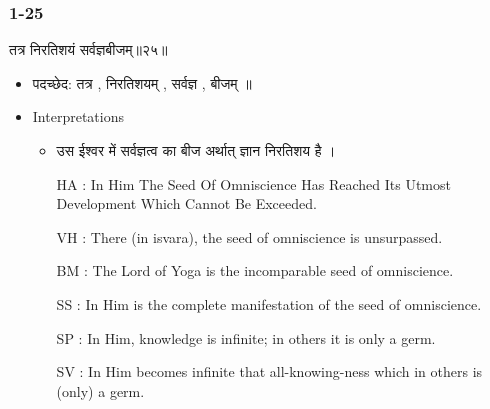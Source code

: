 \begin{frame}[fragile]\frametitle{1-25}
\begin{sanskrit}
तत्र निरतिशयं सर्वज्ञबीजम्॥२५॥
\end{sanskrit}

	\begin{itemize}
	\item पदच्छेद: तत्र , निरतिशयम् , सर्वज्ञ , बीजम् ॥
	\item Interpretations
		\begin{itemize}	
		\item उस ईश्वर में सर्वज्ञत्व का बीज अर्थात् ज्ञान निरतिशय है ।
		\item [HA]: In Him The Seed Of Omniscience Has Reached Its Utmost Development Which Cannot Be Exceeded.
		\item [VH]: There (in isvara), the seed of omniscience is unsurpassed.
		\item [BM]: The Lord of Yoga is the incomparable seed of omniscience.
		\item [SS]: In Him is the complete manifestation of the seed of omniscience.
		\item [SP]: In Him, knowledge is infinite; in others it is only a germ.
		\item [SV]: In Him becomes infinite that all-knowing-ness which in others is (only) a germ. 
		\end{itemize}
	\end{itemize}
	
\end{frame}

